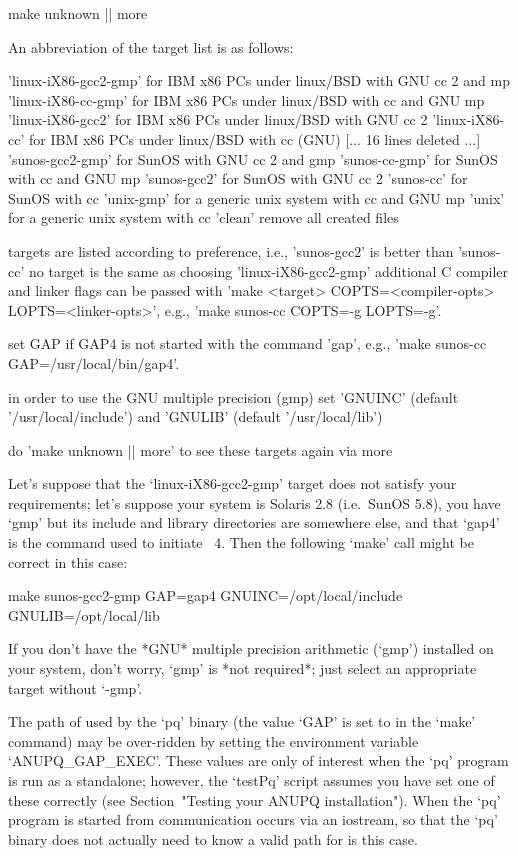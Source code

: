 \begintt
make unknown || more
\endtt

An abbreviation of the target list is as follows:

\begintt
'linux-iX86-gcc2-gmp'      for IBM x86 PCs under linux/BSD with GNU cc 2 and mp
'linux-iX86-cc-gmp'        for IBM x86 PCs under linux/BSD with cc and GNU mp
'linux-iX86-gcc2'          for IBM x86 PCs under linux/BSD with GNU cc 2
'linux-iX86-cc'            for IBM x86 PCs under linux/BSD with cc (GNU)
[... 16 lines deleted ...]
'sunos-gcc2-gmp'           for SunOS with GNU cc 2 and gmp
'sunos-cc-gmp'             for SunOS with cc and GNU mp
'sunos-gcc2'               for SunOS with GNU cc 2
'sunos-cc'                 for SunOS with cc
'unix-gmp'                 for a generic unix system with cc and GNU mp
'unix'                     for a generic unix system with cc
'clean'                    remove all created files

   targets are listed according to preference,
   i.e., 'sunos-gcc2' is better than 'sunos-cc'
   no target is the same as choosing 'linux-iX86-gcc2-gmp'
   additional C compiler and linker flags can be passed with
   'make <target> COPTS=<compiler-opts> LOPTS=<linker-opts>',
   e.g., 'make sunos-cc COPTS=-g LOPTS=-g'.

   set GAP if GAP4 is not started with the command 'gap',
   e.g., 'make sunos-cc GAP=/usr/local/bin/gap4'.

   in order to use the GNU multiple precision (gmp) set
   'GNUINC' (default '/usr/local/include') and 
   'GNULIB' (default '/usr/local/lib')

   do 'make unknown || more' to see these targets again via more
\endtt

Let's suppose that the `linux-iX86-gcc2-gmp' target does not satisfy your
requirements; let's suppose your system is Solaris 2.8 (i.e.~SunOS  5.8),
you have `gmp' but its include  and  library  directories  are  somewhere
else, and that `gap4' is the command used to initiate {\GAP}~4. Then  the
following `make' call might be correct in this case:

\begintt
make sunos-gcc2-gmp GAP=gap4 GNUINC=/opt/local/include GNULIB=/opt/local/lib
\endtt

If you  don't  have  the  *GNU*  multiple  precision  arithmetic  (`gmp')
installed on your system, don't worry,  `gmp'  is  *not  required*;  just
select an appropriate target without `-gmp'.

The path of {\GAP} used by the `pq' binary (the value `GAP' is set to  in
the `make'  command)  may  be  over-ridden  by  setting  the  environment
variable `ANUPQ_GAP_EXEC'. These values are only  of  interest  when  the
`pq' program is run as a standalone; however, the `testPq' script  assumes
you have set one of these  correctly  (see  Section~"Testing  your  ANUPQ
installation"). When the `pq' program is started from {\GAP} communication
occurs via an iostream, so that the `pq' binary does not actually need to
know a valid path for {\GAP} is this case.


